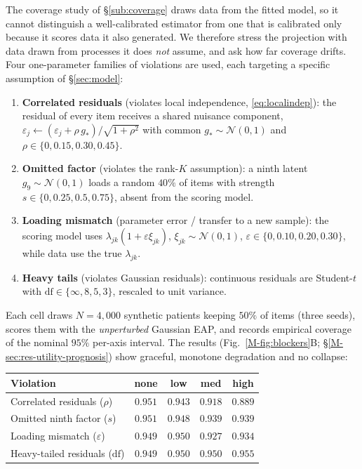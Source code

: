 \documentclass[11pt]{article}
\theoremstyle{plain}
\theoremstyle{definition}
\newcommand{\MSec}[1]{\S\ref{M-#1}}
\newcommand{\MFig}[1]{Fig.~\ref{M-#1}}
\begin{document}
The coverage study of \S\ref{sub:coverage} draws data from the fitted model, so it cannot
distinguish a well-calibrated estimator from one that is calibrated only because it scores data
it also generated. We therefore stress the projection with data drawn from processes it does
\emph{not} assume, and ask how far coverage drifts. Four one-parameter families of violations are
used, each targeting a specific assumption of \S\ref{sec:model}:
\begin{enumerate}\itemsep2pt
  \item \textbf{Correlated residuals} (violates local independence, \eqref{eq:localindep}): the
    residual of every item receives a shared nuisance component,
    $\varepsilon_j\leftarrow(\varepsilon_j+\rho\,g_\ast)/\sqrt{1+\rho^2}$ with common
    $g_\ast\sim\mathcal N(0,1)$ and $\rho\in\{0,0.15,0.30,0.45\}$.
  \item \textbf{Omitted factor} (violates the rank-$K$ assumption): a ninth latent
    $g_9\sim\mathcal N(0,1)$ loads a random $40\%$ of items with strength $s\in\{0,0.25,0.5,0.75\}$,
    absent from the scoring model.
  \item \textbf{Loading mismatch} (parameter error / transfer to a new sample): the scoring model
    uses $\lambda_{jk}(1+\varepsilon\xi_{jk})$, $\xi_{jk}\sim\mathcal N(0,1)$,
    $\varepsilon\in\{0,0.10,0.20,0.30\}$, while data use the true $\lambda_{jk}$.
  \item \textbf{Heavy tails} (violates Gaussian residuals): continuous residuals are Student-$t$
    with $\mathrm{df}\in\{\infty,8,5,3\}$, rescaled to unit variance.
\end{enumerate}
Each cell draws $N=4{,}000$ synthetic patients keeping $50\%$ of items (three seeds), scores them
with the \emph{unperturbed} Gaussian EAP, and records empirical coverage of the nominal $95\%$
per-axis interval. The results (\MFig{fig:blockers}B; \MSec{sec:res-utility-prognosis})
show graceful, monotone degradation and no collapse:
\begin{center}\small
\begin{tabular}{lcccc}
\toprule
Violation & none & low & med & high\\
\midrule
Correlated residuals ($\rho$) & $0.951$ & $0.943$ & $0.918$ & $0.889$\\
Omitted ninth factor ($s$) & $0.951$ & $0.948$ & $0.939$ & $0.939$\\
Loading mismatch ($\varepsilon$) & $0.949$ & $0.950$ & $0.927$ & $0.934$\\
Heavy-tailed residuals ($\mathrm{df}$) & $0.949$ & $0.950$ & $0.950$ & $0.955$\\
\bottomrule
\end{tabular}
\end{center}
\end{document}
